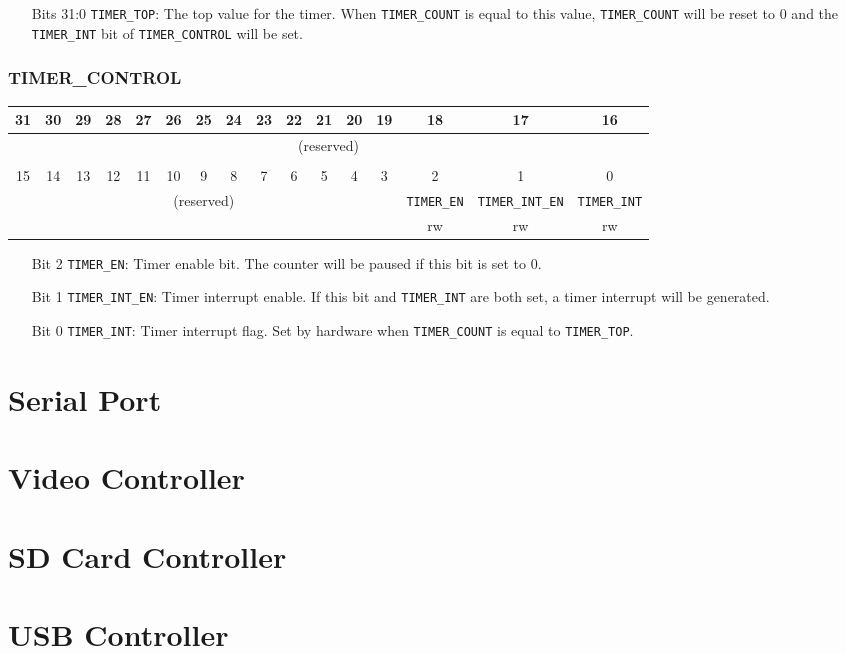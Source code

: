 \documentclass[11pt,openany]{report}
\begin{document}
\begin{enumerate}
  \item[Bits 31:0] \verb|TIMER_TOP|: The top value for the timer. When \verb|TIMER_COUNT|
              is equal to this value, \verb|TIMER_COUNT| will be reset to 0 and
              the \verb|TIMER_INT| bit of \verb|TIMER_CONTROL| will be set.
\end{enumerate}

\subsubsection{TIMER\_CONTROL}
\centering
\begin{tabular}{|c|c|c|c|c|c|c|c|c|c|c|c|c|c|c|c|}
  \hline
  31 & 30 & 29 & 28 & 27 & 26 & 25 & 24 & 23 & 22 & 21 & 20 & 19 & 18 & 17 & 16 \\
  \hline
  \multicolumn{16}{|c|}{\multirow{2}{*}{(reserved)}}\\
  \multicolumn{16}{|c|}{}\\
  \hline
  \multicolumn{16}{c}{}\\
  \hline
  15 & 14 & 13 & 12 & 11 & 10 & 9 & 8 & 7 & 6 & 5 & 4 & 3 & 2 & 1 & 0 \\
  \hline
  \multicolumn{13}{|c|}{\multirow{2}{*}{(reserved)}} & \texttt{TIMER\_EN} & \texttt{TIMER\_INT\_EN} & \texttt{TIMER\_INT} \\
  \cline{14-16}
  \multicolumn{13}{|c|}{} & rw & rw & rw\\
  \hline
\end{tabular}

\begin{enumerate}
  \item[Bit 2] \verb|TIMER_EN|: Timer enable bit. The counter will be paused if
    this bit is set to 0.
  \item[Bit 1] \verb|TIMER_INT_EN|: Timer interrupt enable. If this bit and
    \verb|TIMER_INT| are both set, a timer interrupt will be generated.
  \item[Bit 0] \verb|TIMER_INT|: Timer interrupt flag. Set by hardware
    when \verb|TIMER_COUNT| is equal to \verb|TIMER_TOP|.
\end{enumerate}

\section{Serial Port}

\section{Video Controller}

\section{SD Card Controller}

\section{USB Controller}
\end{document}
